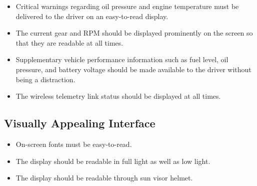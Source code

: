 \begin{itemize}
\item Critical warnings regarding oil pressure and engine temperature must be delivered to the driver on an easy-to-read display.
\item The current gear and RPM should be displayed prominently on the screen so that they are readable at all times.
\item Supplementary vehicle performance information such as fuel level, oil pressure, and battery voltage should be made available to the driver without being a distraction.
\item The wireless telemetry link status should be displayed at all times.
\end{itemize}

\subsection{Visually Appealing Interface}

\begin{itemize}
\item On-screen fonts must be easy-to-read.
\item The display should be readable in full light as well as low light.
\item The display should be readable through sun visor helmet.
\end{itemize}
